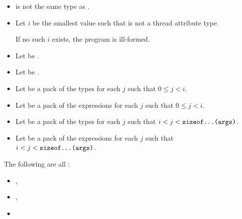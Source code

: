 \documentclass{wg21}
\begin{document}
\begin{itemdescr}

\pnum
\constraints
\begin{itemize}
\item {} is not the same type as .
\end{itemize}

\begin{addedblock}
\begin{itemize}[leftmargin=*]
\item Let $i$ be the smallest value such that  is not a thread attribute type.

If no such $i$ exists, the program is ill-formed.

\item Let  be .
\item Let  be .
\item Let  be a pack of the types  for each $j$ such that $ 0 \leq j < i $.
\item Let  be a pack of the expressions  for each $j$ such that $ 0 \leq j < i $.
\item Let  be a pack of the types  for each $j$ such that $ i < j < \texttt{sizeof...(args)}$.
\item Let  be a pack of the expressions  for each $j$ such that $ i <  j < \texttt{sizeof...(args)}$.
\end{itemize}
\end{addedblock}


%

\pnum
\mandates
The following are all :
\begin{itemize}
    \item {},
    \item {}, 
\begin{addedblock}
\end{addedblock}
    \item {}
\end{itemize}


\end{itemdescr}
\end{document}
